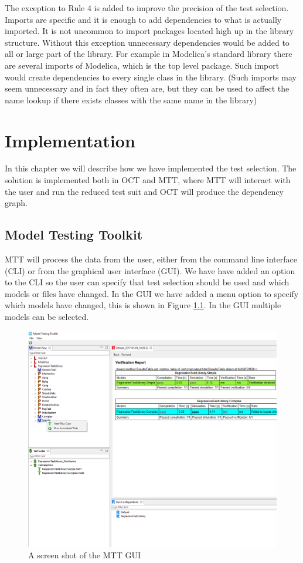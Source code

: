 \documentclass{cslthse-msc}
\begin{document}
The exception to Rule 4 is added to improve the precision of the test selection. Imports are specific and it is enough to add dependencies to what is actually imported. It is not uncommon to import packages located high up in the library structure. Without this exception unnecessary dependencies would be added to all or large part of the library. For example in Modelica's standard library there are several imports of Modelica, which is the top level package. Such import would create dependencies to every single class in the library. (Such imports may seem unnecessary and in fact they often are, but they can be used to affect the name lookup if there exists classes with the same name in the library)  

\chapter[Implementation]{Implementation}
In this chapter we will describe how we have implemented the test selection. The solution is implemented both in OCT and MTT, where MTT will interact with the user and run the reduced test suit and OCT will produce the dependency graph.


\section{Model Testing Toolkit}

MTT will process the data from the user, either from the command line interface (CLI) or from the graphical user interface (GUI). We have have added an option to the CLI so the user can specify that test selection should be used and which models or files have changed. In the GUI we have added a menu option to specify which models have changed, this is shown in Figure \ref{fig:MTTrun}. In the GUI multiple models can be selected.

\begin{figure}[!hbtp]
    \includegraphics[width=1.0\textwidth]{Pictures/MTT_Capture.png}
    \caption{A screen shot of the MTT GUI}
    \label{fig:MTTrun}
\end{figure}
\end{document}
